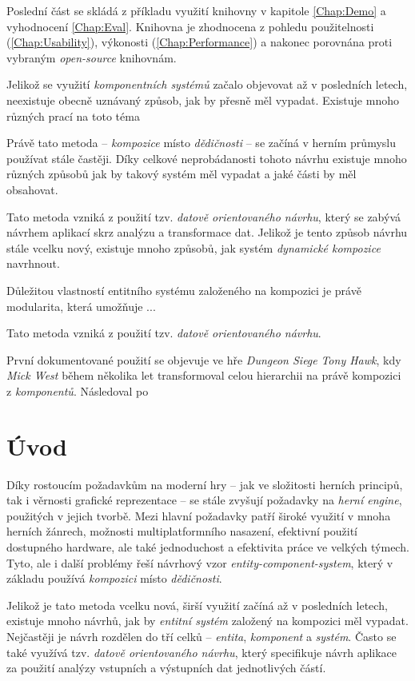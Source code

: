 Poslední část se skládá z příkladu využití knihovny v kapitole \ref{Chap:Demo} a vyhodnocení \ref{Chap:Eval}. Knihovna je zhodnocena z pohledu použitelnosti (\ref{Chap:Usability}), výkonosti (\ref{Chap:Performance}) a nakonec porovnána proti vybraným \emph{open-source} knihovnám.

Jelikož se využití \emph{komponentních systémů} začalo objevovat až v posledních letech, neexistuje obecně uznávaný způsob, jak by přesně měl vypadat. Existuje mnoho různých prací na toto téma

Právě tato metoda -- \emph{kompozice} místo \emph{dědičnosti} -- se začíná v herním průmyslu používat stále častěji. Díky celkové neprobádanosti tohoto návrhu existuje mnoho různých způsobů jak by takový systém měl vypadat a jaké části by měl obsahovat.

Tato metoda vzniká z použití tzv. \emph{datově orientovaného návrhu}\cite{DOD}, který se zabývá návrhem aplikací skrz analýzu a transformace dat. Jelikož je tento způsob návrhu stále vcelku nový, existuje mnoho způsobů, jak systém \emph{dynamické kompozice} navrhnout. 

Důležitou vlastností entitního systému založeného na kompozici je právě modularita, která umožňuje ...

Tato metoda vzniká z použití tzv. \emph{datově orientovaného návrhu}\cite{DOD}.

První dokumentované použití se objevuje ve hře \emph{Dungeon Siege}\cite{DungeonSiege} \emph{Tony Hawk}, kdy \emph{Mick West} během několika let transformoval celou hierarchii na právě kompozici z \emph{komponentů}. Následoval po

\fi

\chapter{Úvod}

Díky rostoucím požadavkům na moderní hry -- jak ve složitosti herních principů, tak i věrnosti grafické reprezentace -- se stále zvyšují požadavky na \emph{herní engine}, použitých v jejich tvorbě. Mezi hlavní požadavky patří široké využití v mnoha herních žánrech, možnosti multiplatformního nasazení, efektivní použití dostupného hardware, ale také jednoduchost a efektivita práce ve velkých týmech. Tyto, ale i další problémy řeší návrhový vzor \emph{entity-component-system}, který v základu používá \emph{kompozici} místo \emph{dědičnosti}.

Jelikož je tato metoda vcelku nová, širší využití začíná až v posledních letech, existuje mnoho návrhů, jak by \emph{entitní systém} založený na kompozici měl vypadat. Nejčastěji je návrh rozdělen do tří celků -- \emph{entita}, \emph{komponent} a \emph{systém}. Často se také využívá tzv. \emph{datově orientovaného návrhu}\cite{DOD}, který specifikuje návrh aplikace za použití analýzy vstupních a výstupních dat jednotlivých částí.

